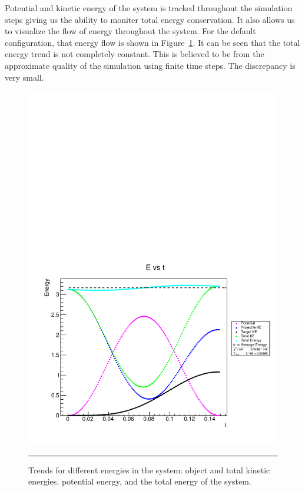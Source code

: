 \documentclass[aps,prl,floatfix,preprint,nofootinbib]{revtex4}
\begin{document}
Potential and kinetic energy of the system is tracked throughout the simulation steps giving us the ability to moniter total energy conservation. It also allows us to visualize the flow of energy throughout the system. For the default configuration, that energy flow is shown in Figure~\ref{fig:energy_default}. It can be seen that the total energy trend is not completely constant. This is believed to be from the approximate quality of the simulation using finite time steps. The discrepancy is very small.
\begin{figure}
  \includegraphics[width=.8\textwidth]{plots/default/E_vs_t.pdf}
  {\par\nobreak\rule[9pt]{35em}{0.5pt}\vspace{-5mm}}
  \caption{Trends for different energies in the system: object and total kinetic energies, potential energy, and the total energy of the system.}
  \label{fig:energy_default}
\end{figure}
\end{document}
